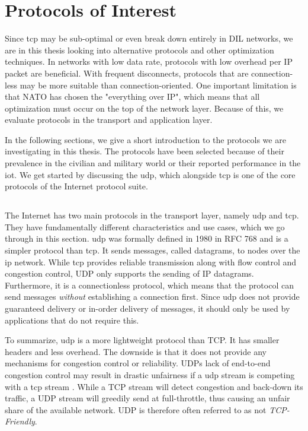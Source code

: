 \section{Protocols of Interest}

Since \gls{tcp} may be sub-optimal or even break down entirely in DIL networks,
we are in this thesis looking into alternative protocols and other optimization
techniques. In networks with low data rate, protocols with low overhead per IP
packet are beneficial. With frequent disconnects, protocols that are
connection-less may be more suitable than connection-oriented. One important
limitation is that NATO has chosen the "everything over IP", which means that
all optimization must occur on the top of the network layer. Because of this, we
evaluate protocols in the transport and application layer.

In the following sections, we give a short introduction to the protocols we are
investigating in this thesis. The protocols have been selected because of their
prevalence in the civilian and military world or their reported performance in
the \gls{iot}. We get started by discussing the \gls{udp}, which alongside
\gls{tcp} is one of the core protocols of the Internet protocol suite.


\subsection{}

The Internet has two main protocols in the transport layer, namely \gls{udp} and
\gls{tcp}. They have fundamentally different characteristics and use cases,
which we go through in this section. \gls{udp} was formally defined in 1980 in
RFC 768\cite{rfc-udp} and is a simpler protocol than \gls{tcp}. It sends
messages, called datagrams, to nodes over the \gls{ip} network. While \gls{tcp}
provides reliable transmission along with flow control and congestion control,
UDP only supports the sending of IP datagrams. Furthermore, it is a
connectionless protocol, which means that the protocol can send messages
\textit{without} establishing a connection first. Since \gls{udp} does not
provide guaranteed delivery or in-order delivery of messages, it should only be
used by applications that do not require this.

To summarize, \gls{udp} is a more lightweight protocol than TCP. It has smaller
headers and less overhead. The downside is that it does not provide any
mechanisms for congestion control or reliability. UDPs lack of end-to-end
congestion control may result in drastic unfairness if a \gls{udp} stream is
competing with a \gls{tcp} stream \cite{floyd-congestion}. While a TCP stream
will detect congestion and back-down its traffic, a UDP stream will greedily
send at full-throttle, thus causing an unfair share of the available network.
UDP is therefore often referred to as not \textit{TCP-Friendly}.

